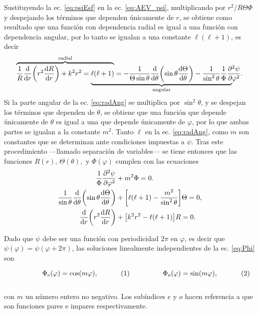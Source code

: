 \documentclass[letterpaper,11pt] {article}
\newcommand{\beqhalf}{\noindent \begin{minipage}[c]{.5\linewidth} \begin{equation}}
\newcommand{\eeqhalf}{\end{equation} \end{minipage} }
\newcommand{\eqhalf}[1]{\beqhalf #1 \eeqhalf}
\begin{document}
Sustituyendo la ec. \eqref{eq:psiEsf} en la ec. \eqref{eq:AEV_psi},  multiplicando por $r^2/R\Theta\Phi$ y despejando los términos que dependen únicamente de $r$, se obtiene como resultado que una función con dependencia radial es igual a una función con dependencia angular, por lo tanto se igualan a una constante $\ell (\ell +1)$, es decir
	\begin{equation}
\mathrlap{\overbrace{\phantom{\frac{1}{R} \dv{r}\qty(r^2\dv{R}{r})+  k^2 r^2 = \ell (\ell +1)}}^{\text{radial}}}
									\frac{1}{R} \dv{r}\qty(r^2\dv{R}{r})+  k^2 r^2 = 
      \mathrlap{\underbrace{\phantom{\ell (\ell +1)=
									-\frac{1}{\Theta\sin\theta}\dv{\theta}\qty(\sin\theta\dv{\Theta}{\theta})
								  \frac{1}{\sin^2\theta}\frac{1}{\Phi}\pdv[2]{\psi}{\varphi} }}_{\text{angular}}}
						 \ell (\ell +1)=
						-\frac{1}{\Theta\sin\theta}\dv{\theta}\qty(\sin\theta\dv{\Theta}{\theta})
					 - \frac{1}{\sin^2\theta}\frac{1}{\Phi}\pdv[2]{\psi}{\varphi}.\label{eq:radAng}
	\end{equation}
Si la parte angular de la ec. \eqref{eq:radAng} se multiplica por $\sin^2\theta$, y se despejan los términos que dependen de $\theta$, se obtiene que una función que depende únicamente de $\theta$ es igual a una que depende únicamente de $\varphi$, por lo que ambas partes se igualan a la constante $m^2$. Tanto $\ell$ en la ec. \eqref{eq:radAng}, como $m$ son constantes que se determinan ante condiciones impuestas a $\psi$. Tras este procedimiento ---llamado separación de variables--- se tiene entonces que las funciones $R(r),\, \Theta(\theta), \mbox{ y } \Phi(\varphi)$ cumplen con las ecuaciones
\begin{align}
\frac{1}{\Phi}\pdv[2]{\psi}{\varphi} &+ m^2 \Phi =0. \label{eq:Phi}\\
\frac{1}{\sin\theta}\dv{\theta}\qty(\sin\theta\dv{\Theta}{\theta}) &+ \qty[\ell(\ell+1)- \frac{m^2}{\sin^2\theta}]\Theta =0,\label{eq:Theta}\\
\dv{r}\qty(r^2\dv{R}{r}) &+ \qty[ k^2 r^2 - \ell (\ell +1)] R =0. \label{eq:R}
\end{align}

Dado que $\psi$ debe ser una función con periodicidad $2\pi$ en $\varphi$, es decir que $\psi(\varphi) = \psi(\varphi+2\pi)$, las soluciones linealmente independientes de la ec. \eqref{eq:Phi} son \\

	\begin{subequations}
	\eqhalf{\Phi_e(\varphi) = \cos(m\varphi),}
	\eqhalf{\Phi_o(\varphi) = \sin(m\varphi),} 
	\end{subequations}\\
con $m$ un número entero no negativo. Los subíndices $e$ y $o$ hacen referencia a que son funciones pares e impares respectivamente.\\
\end{document}
